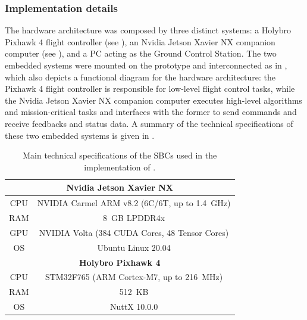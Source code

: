 \subsubsection{Implementation details}
\label{sec:robots_results_paperdrone2021_impl}
The hardware architecture was composed by three distinct systems: a Holybro Pixhawk 4 flight controller (see ), an Nvidia Jetson Xavier NX companion computer (see ), and a PC acting as the Ground Control Station. The two embedded systems were mounted on the prototype and interconnected as in , which also depicts a functional diagram for the hardware architecture: the Pixhawk 4 flight controller is responsible for low-level flight control tasks, while the Nvidia Jetson Xavier NX companion computer executes high-level algorithms and mission-critical tasks and interfaces with the former to send commands and receive feedbacks and status data. A summary of the technical specifications of these two embedded systems is given in .
\begin{table}[t]
  \centering
  \begin{tabular}{|c|c|}
    \hline
    \multicolumn{2}{|c|}{\textbf{Nvidia Jetson Xavier NX}}\\
    \hline
    CPU & NVIDIA Carmel ARM v8.2 (6C/6T, up to \SI{1.4}{GHz})\\
    RAM & \SI{8}{GB} LPDDR4x\\
    GPU & NVIDIA Volta (384 CUDA Cores, 48 Tensor Cores)\\
    OS  & Ubuntu Linux 20.04\\
    \hline
    \multicolumn{2}{|c|}{\textbf{Holybro Pixhawk 4}}\\
    \hline
    CPU & STM32F765 (ARM Cortex-M7, up to \SI{216}{MHz})\\
    RAM & \SI{512}{KB}\\
    OS  & NuttX 10.0.0\\
    \hline
  \end{tabular}
  \caption{Main technical specifications of the SBCs used in the implementation of \cite{bianchi_novel_2023}.}
  \label{tab:ldc21_sbcs}
\end{table}

